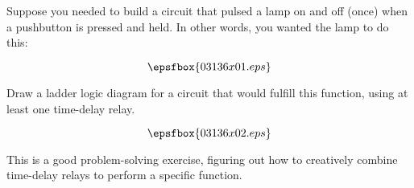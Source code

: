 

Suppose you needed to build a circuit that pulsed a lamp on and off (once) when a pushbutton is pressed and held.  In other words, you wanted the lamp to do this:

$$\epsfbox{03136x01.eps}$$

Draw a ladder logic diagram for a circuit that would fulfill this function, using at least one time-delay relay.







$$\epsfbox{03136x02.eps}$$







This is a good problem-solving exercise, figuring out how to creatively combine time-delay relays to perform a specific function.




